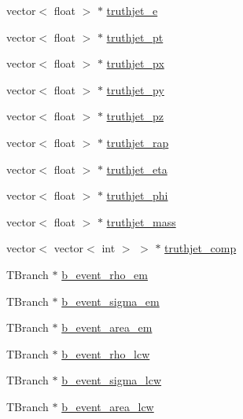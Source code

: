 \begin{DoxyCompactItemize}
\item 
vector$<$ float $>$ $\ast$ \hyperlink{classCollectionTree_a583edf288096c65cc5bd1f2262f83b6c}{truthjet\+\_\+e}
\item 
vector$<$ float $>$ $\ast$ \hyperlink{classCollectionTree_a3aabfbe6ef6ca6c1e3de11621a45ad58}{truthjet\+\_\+pt}
\item 
vector$<$ float $>$ $\ast$ \hyperlink{classCollectionTree_a074492d3bf2d9f4925fa1ce25f6eaa7d}{truthjet\+\_\+px}
\item 
vector$<$ float $>$ $\ast$ \hyperlink{classCollectionTree_a85fc8e61bbd3be08ae0f7b8d99693210}{truthjet\+\_\+py}
\item 
vector$<$ float $>$ $\ast$ \hyperlink{classCollectionTree_a64e937f17763886c7ec7c7b5494b5f45}{truthjet\+\_\+pz}
\item 
vector$<$ float $>$ $\ast$ \hyperlink{classCollectionTree_ab975e9a7d32b0b153a8d110d54d4cedb}{truthjet\+\_\+rap}
\item 
vector$<$ float $>$ $\ast$ \hyperlink{classCollectionTree_af0db1a35e0de9f5ea7a24a93de0172e0}{truthjet\+\_\+eta}
\item 
vector$<$ float $>$ $\ast$ \hyperlink{classCollectionTree_a888fad7f4e7e0d70d67782cdddeb7127}{truthjet\+\_\+phi}
\item 
vector$<$ float $>$ $\ast$ \hyperlink{classCollectionTree_a43b356541bef021934471bba8e28cc60}{truthjet\+\_\+mass}
\item 
vector$<$ vector$<$ int $>$ $>$ $\ast$ \hyperlink{classCollectionTree_a404276ff99ba60fef57cf083dad8b8ac}{truthjet\+\_\+comp}
\item 
T\+Branch $\ast$ \hyperlink{classCollectionTree_a094bfb44ca2ac99a0fe5c982cacc0953}{b\+\_\+event\+\_\+rho\+\_\+em}
\item 
T\+Branch $\ast$ \hyperlink{classCollectionTree_a283dcd287d1992368d2dcb7937fca060}{b\+\_\+event\+\_\+sigma\+\_\+em}
\item 
T\+Branch $\ast$ \hyperlink{classCollectionTree_a99a5722aa84e27bdeda642234fa5c64e}{b\+\_\+event\+\_\+area\+\_\+em}
\item 
T\+Branch $\ast$ \hyperlink{classCollectionTree_a95b65dea6d6ede7506a6386c041b4e84}{b\+\_\+event\+\_\+rho\+\_\+lcw}
\item 
T\+Branch $\ast$ \hyperlink{classCollectionTree_a4e82faa1c0f8a19f45efcd30a17fd8ce}{b\+\_\+event\+\_\+sigma\+\_\+lcw}
\item 
T\+Branch $\ast$ \hyperlink{classCollectionTree_a6f57c256dab6a109e926ca869e83af97}{b\+\_\+event\+\_\+area\+\_\+lcw}
\item 

\end{DoxyCompactItemize}

